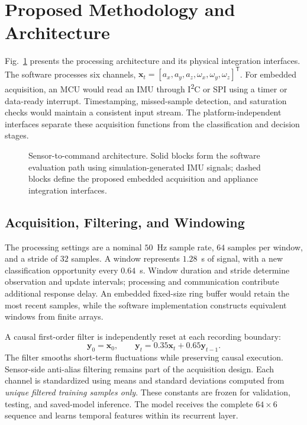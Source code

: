 \documentclass[conference]{IEEEtran}
\begin{document}
\section{Proposed Methodology and Architecture}
Fig.~\ref{fig:architecture} presents the processing architecture and its physical integration interfaces. The software processes six channels, $\mathbf{x}_t=[a_x,a_y,a_z,\omega_x,\omega_y,\omega_z]^\mathsf{T}$. For embedded acquisition, an MCU would read an IMU through I\textsuperscript{2}C or SPI using a timer or data-ready interrupt. Timestamping, missed-sample detection, and saturation checks would maintain a consistent input stream. The platform-independent interfaces separate these acquisition functions from the classification and decision stages.

\begin{figure}[t]\centering

\caption{Sensor-to-command architecture. Solid blocks form the software evaluation path using simulation-generated IMU signals; dashed blocks define the proposed embedded acquisition and appliance integration interfaces.}
\label{fig:architecture}
\end{figure}

\subsection{Acquisition, Filtering, and Windowing}
The processing settings are a nominal $50$~Hz sample rate, $64$ samples per window, and a stride of $32$ samples. A window represents $1.28$~s of signal, with a new classification opportunity every $0.64$~s. Window duration and stride determine observation and update intervals; processing and communication contribute additional response delay. An embedded fixed-size ring buffer would retain the most recent samples, while the software implementation constructs equivalent windows from finite arrays.

A causal first-order filter is independently reset at each recording boundary:
\begin{equation}
\mathbf{y}_0=\mathbf{x}_0,\qquad
\mathbf{y}_t=0.35\mathbf{x}_t+0.65\mathbf{y}_{t-1}.
\end{equation}
The filter smooths short-term fluctuations while preserving causal execution. Sensor-side anti-alias filtering remains part of the acquisition design. Each channel is standardized using means and standard deviations computed from \emph{unique filtered training samples only}. These constants are frozen for validation, testing, and saved-model inference. The model receives the complete $64\times6$ sequence and learns temporal features within its recurrent layer.
\end{document}

